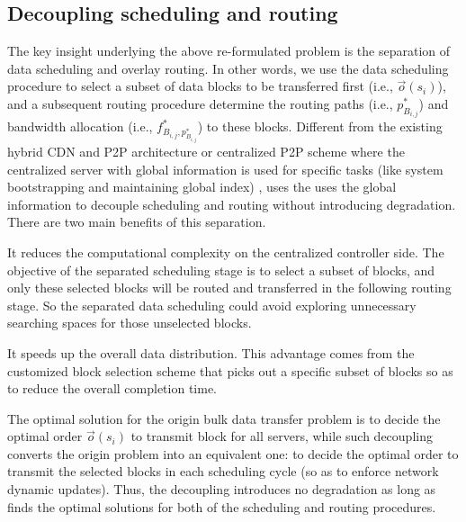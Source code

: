 
\subsection{Decoupling scheduling and routing}
\label{subsec:logic:separation}

The key insight underlying the above re-formulated problem is the
separation of data scheduling and overlay routing.
In other words, we use the data scheduling procedure to select a subset of data blocks to be transferred first
(i.e., $\overrightarrow{o}(s_i)$),
and a subsequent routing procedure determine the routing paths
(i.e., $p_{B_{i,j}}^*$)
and bandwidth allocation (i.e., $f^*_{B_{i,j},p_{B_{i,j}}^*}$) to these blocks.
Different from the existing hybrid CDN and P2P architecture \cite{yin2009design} or centralized P2P scheme \cite{lee2003centralized} where the centralized server with global information is used for specific tasks (like system bootstrapping and maintaining global index) \cite{androutsellis2004survey}, \name uses the uses the global information to decouple scheduling and routing without introducing degradation.
There are two main benefits of this separation.
\begin{packedenumerate}
\item It reduces the computational complexity on the centralized controller side. The objective of the separated scheduling stage is to select a subset of blocks, and only these selected blocks will be routed and transferred in the following routing stage. So the separated data scheduling could avoid exploring unnecessary searching spaces for those unselected blocks.
\item It speeds up the overall data distribution. This advantage comes from the customized block selection scheme that picks out a specific subset of blocks so as to reduce the overall completion time.
\end{packedenumerate}

The optimal solution for the origin bulk data transfer problem is to decide the optimal order $\overrightarrow{o}(s_i)$ to transmit block for all servers, while such decoupling converts the origin problem into an equivalent one: to decide the optimal order to transmit the selected blocks in each scheduling cycle (so as to enforce network dynamic updates). Thus, the decoupling introduces no degradation as long as \name finds the optimal solutions for both of the scheduling and routing procedures.

